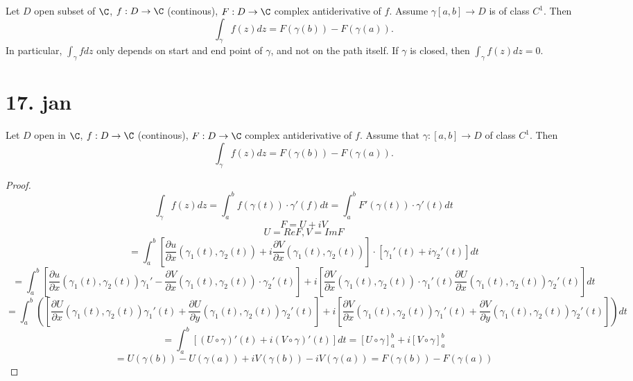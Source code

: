 \begin{lemma}
  Let $D$ open subset of $\C$, $f:D\to \C$ (continous), $F: D\to \C$ complex antiderivative of $f$. Assume $\gamma[a,b]\to D$ is of class $C^1$. Then
    $$\int_{\gamma}f(z)dz=F(\gamma(b))-F(\gamma(a)).$$
  In particular, $\int_{\gamma}fdz$ only depends on start and end point of $\gamma$, and not on the path itself. If $\gamma$ is closed, then $\int_\gamma f(z)dz=0$.
\end{lemma}

\section{17. jan}
\begin{lemma}
  Let $D$ open in $\C$, $f:D\to \C$ (continous), $F:D\to \C$ complex antiderivative of $f$. Assume that $\gamma: [a,b]\to D$ of class $C^1$. Then
    $$\int_{\gamma}f(z)dz=F(\gamma(b))-F(\gamma(a)).$$
\end{lemma}
\begin{proof}
  $$\int_{\gamma}f(z)dz=\int_{a}^{b}f(\gamma(t))\cdot \gamma'(f)dt=\int_{a}^{b}F'(\gamma(t))\cdot \gamma'(t)dt$$
  $$F=U+iV$$
  $$U=Re F, V=ImF$$
  $$=\int_{a}^{b}\left[\frac{\partial u}{\partial x}(\gamma_1(t),\gamma_2(t))+i\frac{\partial V}{\partial x}(\gamma_1(t),\gamma_2(t))\right]\cdot \left[\gamma_1'(t)+i\gamma_2'(t)\right]dt$$
  $$=\int_{a}^{b}\left[\frac{\partial u}{\partial x}(\gamma_1(t),\gamma_2(t))\gamma_1'-\frac{\partial V}{\partial x}(\gamma_1(t),\gamma_2(t))\cdot \gamma_2'(t)\right]+i\left[\frac{\partial V}{\partial x}(\gamma_1(t),\gamma_2(t))\cdot \gamma_1'(t) \frac{\partial U}{\partial x}(\gamma_1(t),\gamma_2(t))\gamma_2'(t)\right]dt$$
  $$=\int_{a}^{b}\left(\left[\frac{\partial U}{\partial x}(\gamma_1(t),\gamma_2(t))\gamma_1'(t)+\frac{\partial U}{\partial y}(\gamma_1(t),\gamma_2(t))\gamma_2'(t)\right]+i\left[\frac{\partial V}{\partial x}(\gamma_1(t),\gamma_2(t))\gamma_1'(t)+\frac{\partial V}{\partial y}(\gamma_1(t),\gamma_2(t))\gamma_2'(t)\right]\right)dt$$
  $$=\int_{a}^{b}\left[\left(U\circ \gamma\right)'(t)+i \left(V\circ \gamma\right)'(t)\right]dt=[U\circ \gamma]_a^b+i[V\circ \gamma]_a^b $$
  $$=U(\gamma(b))-U(\gamma(a))+iV(\gamma(b))-iV(\gamma(a))=F(\gamma(b))-F(\gamma(a))$$
\end{proof}

